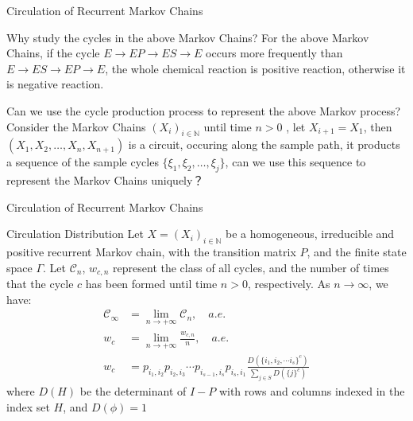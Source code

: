 \documentclass{beamer}
\begin{document}
	\begin{frame}{Circulation of Recurrent Markov Chains}
		\begin{block}{Why study the cycles in the above Markov Chains?}
			For the above Markov Chains, if the cycle $E \rightarrow EP \rightarrow ES \rightarrow E$ occurs more frequently than $E \rightarrow ES \rightarrow EP \rightarrow E$, the whole chemical reaction is positive reaction, otherwise it is negative reaction.

		\end{block}
		\begin{block}{Can we use the cycle production process to represent the above Markov process?}
			Consider the Markov Chains $(\mathit{X}_i)_{i\in \mathbb{N}}$ until time $n>0$ , let $\mathit{X}_{i+1} = \mathit{X}_1$, then $\left(X_1, X_2, \dots, X_n, X_{n+1}\right)$ is a circuit, occuring along the sample path, it products a sequence of the sample cycles $\{\xi_1, \xi_2, \dots, \xi_j\}$, can we use this sequence to represent the Markov Chains uniquely？
		\end{block}
	\end{frame}

	\begin{frame}{Circulation of Recurrent Markov Chains}
		\begin{block}{Circulation Distribution}
			Let $X = (\mathit{X}_i)_{i\in \mathbb{N}}$ be a homogeneous, irreducible and
            positive recurrent Markov chain, with the transition matrix $\mathit{P}$, and the finite state space $\Gamma$.
            Let $\mathcal{C}_n$, $\mathit{w}_{c,n}$ represent the class of all cycles, and the number of times that the cycle $c$ has been formed until time $n>0$, respectively.
            As $n \rightarrow \infty$, we have:
			\begin{align*}
				\mathcal{C}_{\infty} &= \lim_{n \rightarrow +\infty} \mathcal{C}_n, \quad a.e. \\
                \mathit{w}_c &= \lim_{n \rightarrow +\infty} \frac{\mathit{w}_{c,n}}{n}, \quad a.e.\\
                \mathit{w}_c &= \mathit{p}_{i_1, i_2} \mathit{p}_{i_2, i_3} \cdots \mathit{p}_{i_{s-1}, i_{s}} \mathit{p}_{i_s, i_1} \frac{\mathit{D}(\{i_1, i_2, \cdots i_s\}^c)}{\sum_{j\in \mathit{S}} \mathit{D}(\{j\}^c)}
            \end{align*}
            where $\mathit{D}(H)$ be the determinant of $I-P$ with rows and columns indexed in the index set $H$, and $\mathit{D}(\phi) = 1$
		\end{block}
	\end{frame}
\end{document}
